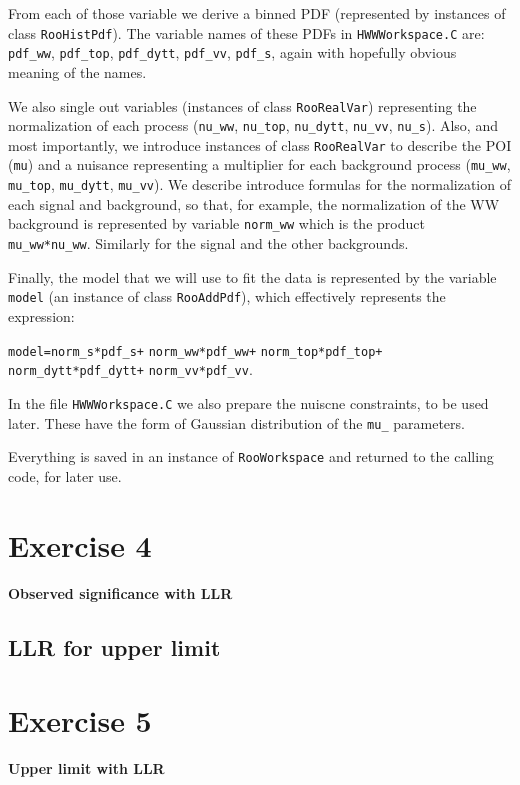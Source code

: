 \documentclass[a4paper,12pt]{article}
\begin{document}
From each of those variable we derive a binned PDF (represented by instances
of class \verb+RooHistPdf+). The variable names of these PDFs in
\verb+HWWWorkspace.C+ are: \verb+pdf_ww+, \verb+pdf_top+, \verb+pdf_dytt+,
\verb+pdf_vv+, \verb+pdf_s+, again with hopefully obvious meaning of the
names.

We also single out variables (instances of class \verb+RooRealVar+)
representing the normalization of each process (\verb+nu_ww+, \verb+nu_top+,
\verb+nu_dytt+, \verb+nu_vv+, \verb+nu_s+).
Also, and most importantly, we introduce instances of class \verb+RooRealVar+
to describe the POI (\verb+mu+) and a nuisance representing a multiplier for
each background process (\verb+mu_ww+, \verb+mu_top+,
\verb+mu_dytt+, \verb+mu_vv+).
We describe introduce formulas for the normalization of each signal and
background, so that, for example, the normalization of the WW background is
represented by variable \verb+norm_ww+ which is the product
\verb+mu_ww*nu_ww+. Similarly for the signal and the other backgrounds.

Finally, the model that we will use to fit the data is represented by the
variable \verb+model+ (an instance of class \verb!RooAddPdf!), which effectively represents the expression:

\verb!model=norm_s*pdf_s+! 
\verb!norm_ww*pdf_ww+! 
\verb!norm_top*pdf_top+!\\ 
\verb!norm_dytt*pdf_dytt+! 
\verb!norm_vv*pdf_vv!.

In the file \verb+HWWWorkspace.C+ we also prepare the nuiscne constraints, to
be used later. These have the form of Gaussian distribution of the \verb+mu_+
parameters.

Everything is saved in an instance of \verb+RooWorkspace+ and returned to the
calling code, for later use.

\section*{Exercise 4}

{\bf Observed significance with LLR}

\subsection{LLR for upper limit}

\section*{Exercise 5}

{\bf Upper limit with LLR}
\end{document}
